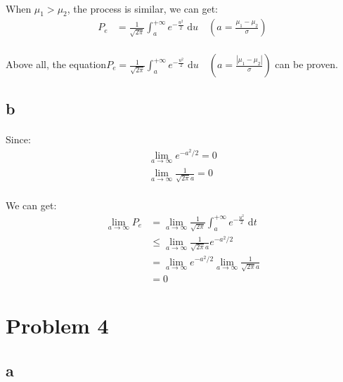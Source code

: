 \documentclass[]{article}
\begin{document}
            \paragraph{}When $\mu_1 > \mu_2$, the process is similar, we can get:
            \begin{align*}
           P_e &=\frac{1}{\sqrt{2\pi}}\int_{a}^{+\infty} e^{-\frac{u^2}{2}}   \; \mathrm{d}u \quad (a=\frac{\mu_1 - \mu_2}{\sigma})
            \end{align*}
            \paragraph{}Above all, the equation$P_e =\frac{1}{\sqrt{2\pi}}\int_{a}^{+\infty} e^{-\frac{u^2}{2}}   \; \mathrm{d}u \quad (a=\frac{|\mu_1 - \mu_2|}{\sigma})$ can be proven.
        \subsection{b}
            \paragraph{}Since:
            \begin{align*}            
            \lim_{a \to \infty} e^{-a^2 /2} = 0 \\
            \lim_{a \to \infty} \frac{1}{\sqrt{2\pi}a} = 0
            \end{align*}
            \paragraph{}We can get:
            \begin{align*}
                \lim_{a \to \infty} P_e &= \lim_{a \to \infty}\frac{1}{\sqrt{2\pi}}\int_{a}^{+\infty} e^{-\frac{u^2}{2}}   \; \mathrm{d}t \\
                    &\leq \lim_{a \to \infty}\frac{1}{\sqrt{2\pi}a}e^{-a^2 /2} \\
                    &=\lim_{a \to \infty} e^{-a^2 /2} \lim_{a \to \infty} \frac{1}{\sqrt{2\pi}a}\\
                    &=0
            \end{align*}
            
    \section{Problem 4}
        \subsection{a}
\end{document}
